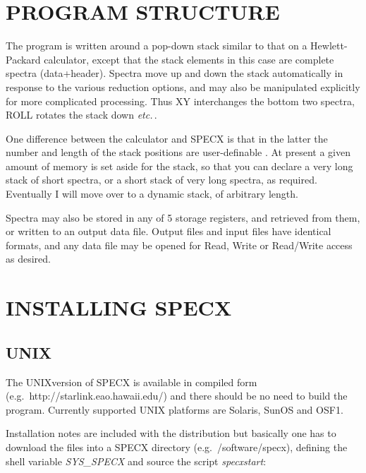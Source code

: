 \documentclass[11pt,twoside]{report}
\newcommand{\etc}{{\it etc.\,}}
\begin{document}
\section{PROGRAM STRUCTURE}

The program is written around a pop-down stack similar to
that on a Hewlett-Packard
calculator, except that the stack
elements in this case are complete spectra (data+header). Spectra move
up and down the stack automatically in response to the various
reduction options, and may also be manipulated explicitly for more
complicated processing. Thus XY interchanges the
bottom two spectra, ROLL rotates the stack down
\etc.

One difference between the calculator and SPECX is that in the latter
the number and length of the stack positions are user-definable
. At present a given amount of memory is set
aside for the stack, so that you can declare a very long stack of
short spectra, or a short stack of very long spectra, as
required. Eventually I will move over to a dynamic stack, of arbitrary
length.

Spectra may also be stored in any of 5 storage registers, and retrieved from them, or written to an output data file. Output
files and input files have identical formats, and any data file may be opened
for Read, Write or Read/Write access as desired.

\section{INSTALLING SPECX}

\subsection{UNIX}

The UNIXversion of SPECX is available in compiled form
(e.g.\ http://starlink.eao.hawaii.edu/) and there should be no need
to build the program. Currently supported UNIX platforms are
Solaris, SunOS and OSF1.

Installation notes are included with the distribution but basically
one has to download the files into a SPECX directory (e.g.\
/software/specx), defining the shell variable {\em SYS\_SPECX} and
source the script {\em specxstart}\index{startup file}:
\end{document}
